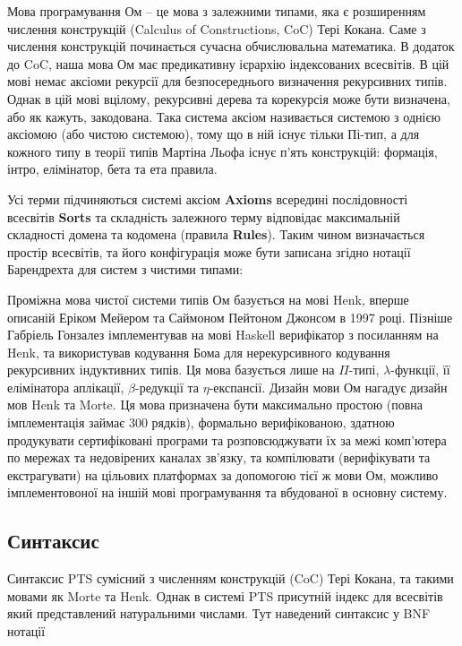 Мова програмування Ом -- це мова з залежними типами, яка є розширенням
числення конструкцій (Calculus of Constructions, CoC) Тері Кокана. Саме з числення
конструкцій починається сучасна обчислювальна математика. В додаток до CoC,
наша мова Ом має предикативну ієрархію індексованих всесвітів. В цій мові немає
аксіоми рекурсії для безпосереднього визначення рекурсивних типів. Однак в цій мові
вцілому, рекурсивні дерева та корекурсія може бути визначена, або як кажуть, закодована.
Така система аксіом називається системою з однією аксіомою (або чистою системою), тому що в ній
існує тільки Пі-тип, а для кожного типу в теорії типів Мартіна Льофа існує п'ять
конструкцій: формація, інтро, елімінатор, бета та ета правила.

Усі терми підчиняються системі аксіом \textbf{Axioms} всередині
послідовності всесвітів \textbf{Sorts} та складність залежного
терму відповідає максимальній складності домена та кодомена
(правила \textbf{Rules}). Таким чином визначається простір всесвітів,
та його конфігурація може бути записана згідно нотації
Барендрехта для систем з чистими типами:

Проміжна мова чистої системи типів Ом базується на мові
Henk\cite{Erik97}, вперше описаній Еріком Мейером та Саймоном Пейтоном Джонсом в 1997 році.
Пізніше Габріель Гонзалез імплементував на мові Haskell
верифікатор з посиланням на Henk, та використував кодування Бома для нерекурсивного
кодування рекурсивних індуктивних типів. Ця мова базується лише на $\Pi$-типі,
$\lambda$-функції, її елімінатора аплікації, $\beta$-редукції та $\eta$-експансії.
Дизайн мови Ом нагадує дизайн мов Henk та Morte.
Ця мова призначена бути максимально простою (повна імплементація займає 300 рядків),
формально верифікованою, здатною продукувати сертифіковані програми та
розповсюджувати їх за межі комп'ютера по мережах та недовірених каналах зв'язку,
та компілювати (верифікувати та екстрагувати) на цільових платформах за допомогою
тієї ж мови Ом, можливо імплементовоної на іншій мові програмування та вбудованої
в основну систему.

\subsection{Синтаксис}

Синтаксис PTS сумісний з численням конструкцій (CoC) Тері Кокана,
та такими мовами як Morte та Henk.
Однак в системі PTS присутній індекс для всесвітів який
представлений натуральними числами. Тут наведений синтаксис у BNF нотації

